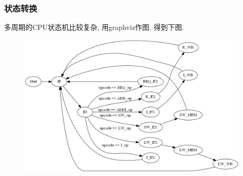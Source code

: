 \documentclass[UTF8]{article}
\begin{document}
\subsubsection{状态转换}
多周期的CPU状态机比较复杂, 用graphviz作图, 得到下图.\par
\begin{figure}[H]
	\centering
	\includegraphics[width=\linewidth]{cpu_phase_diagram.png}
\end{figure}
\end{document}
